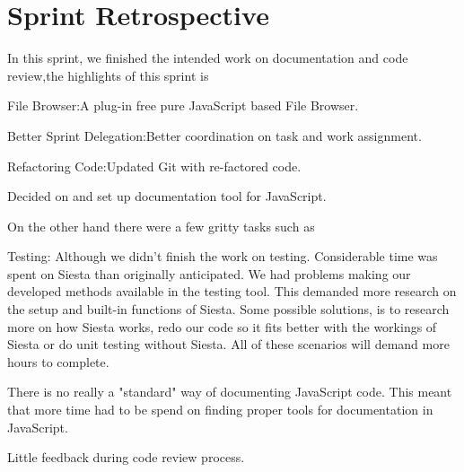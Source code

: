 \section{Sprint Retrospective} %
\label{sec:Sprint Retrospective}

In this sprint, we finished the intended work on documentation and code review,the highlights of this sprint is

\item File Browser:A plug-in free pure JavaScript based File Browser.

\item Better Sprint Delegation:Better coordination on task and work assignment.

\item Refactoring Code:Updated Git with re-factored code.

\item Decided on and set up documentation tool for JavaScript.

On the other hand there were a few gritty tasks such as

\item Testing: Although we didn't finish the work on testing. Considerable time was spent on Siesta than originally anticipated. 
	 We had problems making our developed methods available in the testing tool. This demanded more research on the setup and built-in functions of Siesta. Some possible solutions, is to research more on how Siesta works, redo our code so it 
	 fits better with the workings of Siesta or do unit testing without Siesta. All of these scenarios will demand more hours to complete.

\item There is no really a "standard" way of documenting JavaScript code. This meant that more time had to be spend on finding proper tools for documentation in JavaScript.

\item Little feedback during code review process.
